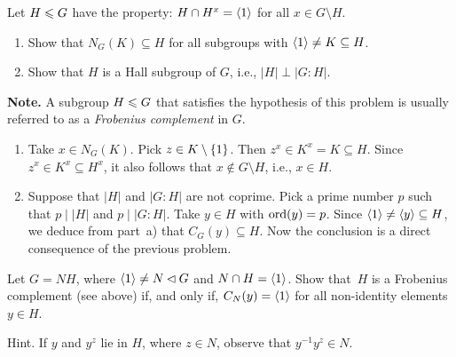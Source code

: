 \begin{probl}\label{problem-1.D.3}
    Let $H \leqslant G$ have the property: $H \cap H^x = \langle1\rangle$ for all $x\in G\setminus H$.
    \begin{enumerate}[\upshape a)]
        \item Show that $N_G(K) \subseteq H$ for all subgroups with $\langle1\rangle\ne K \subseteq H$.
        \item Show that $H$ is a Hall subgroup of\/ $G$, i.e., $|H|\perp|G:H|$.
    \end{enumerate}
    \textbf{Note.} A subgroup $H\leqslant G$ that satisfies the hypothesis of this problem is usually referred to as a \textsl{Frobenius complement} in $G$.

\end{probl}

\begin{solution}
\begin{enumerate}[\upshape a)]
    \item Take $x\in N_G(K)$. Pick $z\in K\setminus\{1\}$. Then $z^x\in K^x=K\subseteq H$. Since $z^x\in K^x\subseteq H^x$, it also follows that $x\notin G\setminus H$, i.e., $x\in H$.

    \item Suppose that $|H|$ and $|G:H|$ are not coprime. Pick a prime number $p$ such that $p\mid|H|$ and $p\mid|G:H|$. Take $y\in H$ with ${\rm ord}(y)=p$. Since $\langle1\rangle\ne\langle y\rangle\subseteq H$, we deduce from part~a) that $C_G(y)\subseteq H$. Now the conclusion is a direct consequence of the previous problem.
\end{enumerate}
\end{solution}


\begin{probl}
    Let\/ $G = NH$, where $\langle1\rangle \ne N\lhd G$ and\/ $N \cap H = \langle1\rangle$. Show that\/~$H$ is a Frobenius complement (see above) if, and only if, $C_N(y) = \langle1\rangle$ for all non-identity elements $y \in H$.

    \textrm{\upshape Hint. If $y$ and $y^z$ lie in $H$, where $z \in N$, observe that $y^{-1}y^z \in N$.}
\end{probl}

